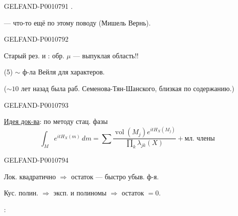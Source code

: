 \begin{GelfandAdjacentEvidence}{GELFAND-P001079}{1}
\quad{}.

 — что-то ещё по этому поводу (Мишель Вернь).
\end{GelfandAdjacentEvidence}
\begin{GelfandAdjacentEvidence}{GELFAND-P001079}{2}


Старый рез.  и :
обр. $\mu$ — выпуклая область!!

(5) $\sim$ ф-ла Вейля для характеров.

($\sim10$ лет назад была раб. Семенова-Тян-Шанского, близкая по содержанию.)
\end{GelfandAdjacentEvidence}
\begin{GelfandAdjacentEvidence}{GELFAND-P001079}{3}


\uline{Идея док-ва}: по методу стац. фазы
\begin{equation*}
\int_M e^{itH_X(m)}\,dm
=\sum\frac{\operatorname{vol}(M_j)e^{itH_X(M_j)}}
{\prod_k\lambda_{jk}(X)}+\text{мл. члены}
\end{equation*}
\end{GelfandAdjacentEvidence}
\begin{GelfandAdjacentEvidence}{GELFAND-P001079}{4}


Лок. квадратично $\Rightarrow$ остаток — быстро убыв. ф-я.

Кус. полин. $\Rightarrow$ эксп. и полиномы $\Rightarrow$ остаток $=0$.

:
\end{GelfandAdjacentEvidence}
